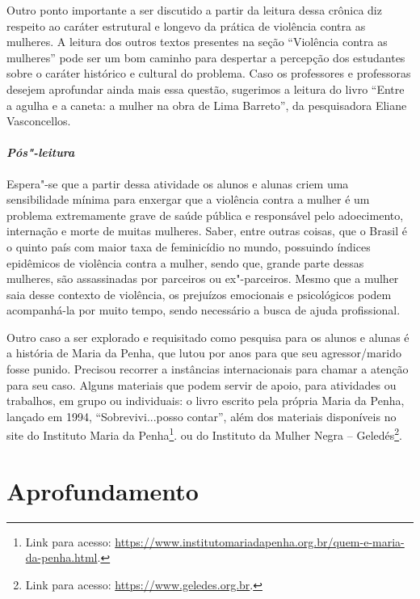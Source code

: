 \documentclass[11pt]{extarticle}
\begin{document}
Outro ponto importante a ser discutido a partir da leitura dessa crônica
diz respeito ao caráter estrutural e longevo da prática de violência
contra as mulheres. A leitura dos outros textos presentes na seção
``Violência contra as mulheres'' pode ser um bom caminho para despertar
a percepção dos estudantes sobre o caráter histórico e cultural do
problema. Caso os professores e professoras desejem aprofundar ainda
mais essa questão, sugerimos a leitura do livro ``Entre a agulha e a
caneta: a mulher na obra de Lima Barreto'', da pesquisadora Eliane
Vasconcellos.

\paragraph{\textit{Pós"-leitura}}

Espera"-se que a partir dessa atividade os alunos e alunas criem uma
sensibilidade mínima para enxergar que a violência contra a mulher é um
problema extremamente grave de saúde pública e responsável pelo
adoecimento, internação e morte de muitas mulheres. Saber, entre outras
coisas, que o Brasil é o quinto país com maior taxa de feminicídio no
mundo, possuindo índices epidêmicos de violência contra a mulher, sendo
que, grande parte dessas mulheres, são assassinadas por parceiros ou
ex"-parceiros. Mesmo que a mulher saia desse contexto de violência, os
prejuízos emocionais e psicológicos podem acompanhá-la por muito tempo,
sendo necessário a busca de ajuda profissional.

Outro caso a ser explorado e requisitado como pesquisa para os alunos e
alunas é a história de Maria da Penha, que lutou por anos para que seu
agressor/marido fosse punido. Precisou recorrer a instâncias
internacionais para chamar a atenção para seu caso. Alguns materiais que
podem servir de apoio, para atividades ou trabalhos, em grupo ou
individuais: o livro escrito pela própria Maria da Penha, lançado em
1994, ``Sobrevivi...posso contar'', além dos materiais disponíveis no
site do Instituto Maria da Penha\footnote{Link para acesso:
  \url{https://www.institutomariadapenha.org.br/quem-e-maria-da-penha.html}.}.
ou do Instituto da Mulher Negra -- Geledés\footnote{Link para acesso:
  \url{https://www.geledes.org.br}.}.






\section{Aprofundamento}
\end{document}
